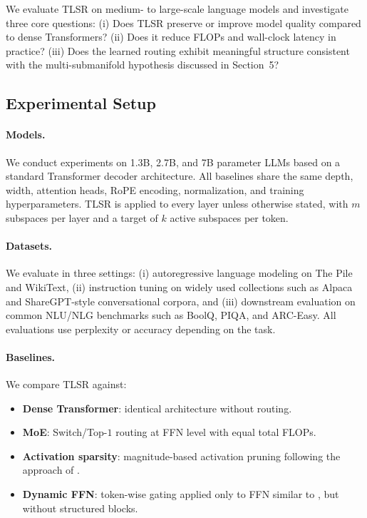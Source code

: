 \documentclass{article}
\theoremstyle{plain}
\theoremstyle{definition}
\theoremstyle{remark}
\begin{document}
We evaluate TLSR on medium- to large-scale language models and investigate
three core questions:
(i) Does TLSR preserve or improve model quality compared to dense Transformers?
(ii) Does it reduce FLOPs and wall-clock latency in practice?
(iii) Does the learned routing exhibit meaningful structure consistent with the
multi-submanifold hypothesis discussed in Section~5?

\subsection{Experimental Setup}

\paragraph{Models.}
We conduct experiments on 1.3B, 2.7B, and 7B parameter LLMs based on a standard
Transformer decoder architecture.
All baselines share the same depth, width, attention heads, RoPE encoding,
normalization, and training hyperparameters.
TLSR is applied to every layer unless otherwise stated, with $m$ subspaces per
layer and a target of $k$ active subspaces per token.

\paragraph{Datasets.}
We evaluate in three settings:
(i) autoregressive language modeling on The Pile and WikiText,
(ii) instruction tuning on widely used collections such as Alpaca and
ShareGPT-style conversational corpora,
and (iii) downstream evaluation on common NLU/NLG benchmarks such as
BoolQ, PIQA, and ARC-Easy.
All evaluations use perplexity or accuracy depending on the task.

\paragraph{Baselines.}
We compare TLSR against:
\begin{itemize}
    \item \textbf{Dense Transformer}: identical architecture without routing.
    \item \textbf{MoE}: Switch/Top-$1$ routing at FFN level with equal total FLOPs.
    \item \textbf{Activation sparsity}: magnitude-based activation pruning
          following the approach of \cite{fang2024maskllm}.
    \item \textbf{Dynamic FFN}: token-wise gating applied only to FFN
          similar to \cite{li2023lazyneuron}, but without structured blocks.
\end{itemize}
\end{document}
